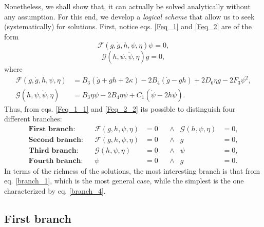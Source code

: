 \documentclass{article}
\begin{document}
Nonetheless, we shall show that, it can actually be solved analytically without any assumption. For this end,
we develop a \textit{logical scheme} that allow us to seek (systematically) for solutions. First, notice eqs. \eqref{Feq_1} 
and \eqref{Feq_2} are of the form
\begin{dmath}
    \label{Feq_1_1}
    \mathcal{F}(g, \dot{g}, h,\psi,\eta)\psi = 0,
\end{dmath}
\begin{dmath}
    \label{Feq_2_2}
    \mathcal{G}(h,\psi, \dot{\psi}, \eta)g = 0,
\end{dmath}
where
\begin{align}
\mathcal{F}(g,\dot{g},h,\psi,\eta)    & = B_3\left(\dot{g} + gh + 2\kappa\right) - 2B_4\left(\dot{g} - gh\right) + 2D_6\eta g - 2F_3\psi^2,\\
\mathcal{G}(h,\psi, \dot{\psi}, \eta) & = B_3\eta\psi -2B_4\eta\psi + C_1\left(\dot{\psi} - 2h\psi\right).
\end{align}
Thus, from eqs. \eqref{Feq_1_1} and \eqref{Feq_2_2} its possible to distinguish four different branches:
\begin{align}
    \textbf{First branch:}  && \mathcal{F}(g,h,\psi,\eta) & = 0 & & \wedge & \mathcal{G}(h,\psi,\eta) & = 0,  \label{branch_1}\\
    \textbf{Second branch:} && \mathcal{F}(g,h,\psi,\eta) & = 0 & & \wedge & g & = 0, \label{branch_2}\\
    \textbf{Third branch:}  && \mathcal{G}(h,\psi,\eta)  & = 0  & & \wedge & \psi & = 0, \label{branch_3}\\
    \textbf{Fourth branch:} && \psi & = 0 & & \wedge & g & = 0. \label{branch_4}
\end{align}
In terms of the richness of the solutions, the most interesting branch is that from eq. \eqref{branch_1},
which is the most general case, while the simplest is the one characterized by eq. \eqref{branch_4}.

\subsection{First branch}
\label{sec:first_branch}
\end{document}
